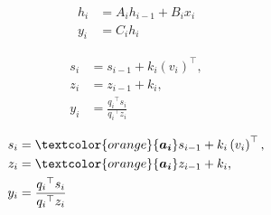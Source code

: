 \begin{minipage}[t]{.3\linewidth}
  \begin{subequations}\label{eq:ssmm}
    \begin{align}
     h_i &= A_ih_{i-1} + B_ix_i \\
    y_i &= C_i h_i
    \end{align}
  \end{subequations}
\end{minipage}%
\begin{minipage}[t]{.3\linewidth}
  \begin{subequations}%
    
    \begin{align}
    s_i &= s_{i-1} + {k_i} \left(v_i\right)^{\top}, \\
    z_i &= z_{i-1} + k_i, \\
    y_i &= \frac{{q_i}^{\top} s_i}{{q_i}^{\top} z_i} 
    \end{align}
  \end{subequations}
  \end{minipage}
  \begin{minipage}[t]{.4\linewidth}
    \begin{subequations}%
    \label{eq:linscaletrans}
    \begin{align}
    s_i &= \textcolor{orange}{\boldsymbol{a_i}} s_{i-1} + {k_i} \left(v_i\right)^{\top}, \\
    z_i &= \textcolor{orange}{\boldsymbol{a_i}} z_{i-1} + k_i, \\
    y_i &= \frac{{q_i}^{\top} s_i}{{q_i}^{\top} z_i} 
    \end{align}
  \end{subequations}
\end{minipage}

